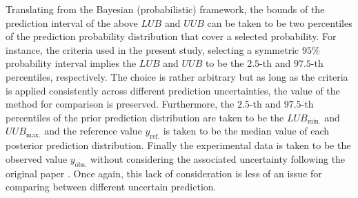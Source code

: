 Translating from the Bayesian (probabilistic) framework, the bounds of the prediction interval of the above $LUB$ and $UUB$ can be taken to be two percentiles of the prediction probability distribution that cover a selected probability.
For instance, the criteria used in the present study, selecting a symmetric $95\%$ probability interval implies the $LUB$ and $UUB$ to be the $2.5$-th and $97.5$-th percentiles, respectively.
The choice is rather arbitrary but as long as the criteria is applied consistently across different prediction uncertainties, the value of the method for comparison is preserved.
Furthermore, the $2.5$-th and $97.5$-th percentiles of the prior prediction distribution are taken to be the $LUB_{\text{min.}}$ and $UUB_{\text{max.}}$ and the reference value $y_\text{ref.}$ is taken to be the median value of each posterior prediction distribution.
Finally the experimental data is taken to be the observed value $y_\text{obs.}$ without considering the associated uncertainty following the original paper \cite{Baccou2014}.
Once again, this lack of consideration is less of an issue for comparing between different uncertain prediction.
 
